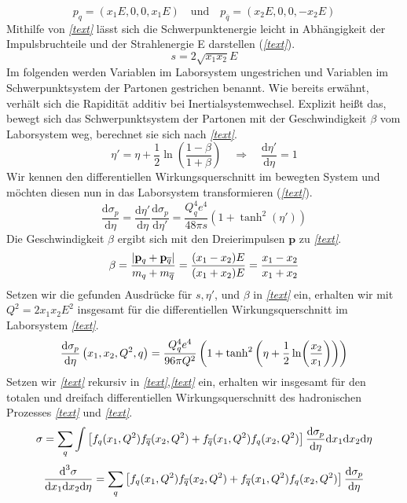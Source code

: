 \begin{equation}
	p_q = \left(x_1E, 0, 0, x_1E\right) \quad \text{und} \quad p_{\overline{q}} = \left(x_2E, 0, 0, -x_2E\right)
\end{equation}
Mithilfe von \textit{\autoref{text}} lässt sich die Schwerpunktenergie leicht in Abhängigkeit der Impulsbruchteile und der Strahlenergie E darstellen (\textit{\autoref{text}}).
\begin{equation}
	s = 2\sqrt{x_1x_2}E
\end{equation}
Im folgenden werden Variablen im Laborsystem ungestrichen und Variablen im Schwerpunktsystem der Partonen gestrichen benannt. Wie bereits erwähnt, verhält sich die Rapidität additiv bei Inertialsystemwechsel. Explizit heißt das, bewegt sich das Schwerpunktsystem der Partonen mit der Geschwindigkeit $\beta$ vom Laborsystem weg, berechnet sie sich nach \textit{\autoref{text}}.
\begin{equation}
	\eta' = \eta + \frac{1}{2}\ln(\frac{1-\beta}{1+\beta}) \quad \Rightarrow \quad \frac{\text{d}\eta'}{\text{d}\eta} = 1 
\end{equation}
Wir kennen den differentiellen Wirkungsquerschnitt im bewegten System und möchten diesen nun in das Laborsystem transformieren (\textit{\autoref{text}}). 
\begin{equation}
	\frac{\text{d}\sigma_p}{\text{d}\eta} = \frac{\text{d}\eta'}{\text{d}\eta} \frac{\text{d}\sigma_p}{\text{d}\eta'} = \frac{Q_q^4e^4}{48\pi s}(1+\tanh^2(\eta'))
\end{equation}
Die Geschwindigkeit $\beta$ ergibt sich mit den Dreierimpulsen $\mathbf{p}$ zu \textit{\autoref{text}}.
\begin{equation}
	\beta = \frac{\abs{\mathbf{p}_q + \mathbf{p}_{\overline{q}}}}{m_q + m_{\overline{q}}} = \frac{(x_1 - x_2)E}{(x_1 + x_2)E} = \frac{x_1 - x_2}{x_1 + x_2}
\end{equation}
Setzen wir die gefunden Ausdrücke für $s, \eta'$, und $\beta$ in \textit{\autoref{text}} ein, erhalten wir mit $Q^2 = 2 x_1 x_2 E^2$ insgesamt für die differentiellen Wirkungsquerschnitt im Laborsystem \textit{\autoref{text}}.
\begin{equation}
	\derivative{\sigma_p}{\eta}\left(x_1, x_2, Q^2, q\right) = \frac{Q_q^4e^4}{96\pi Q^2} \left(1+\tanh^2\left(\eta + \frac{1}{2}\ln(\frac{x_2}{x_1})\right)\right)
\end{equation}
Setzen wir \textit{\autoref{text}} rekursiv in \textit{\autoref{text}},\textit{\autoref{text}} ein, erhalten wir insgesamt für den totalen und dreifach differentiellen Wirkungsquerschnitt des hadronischen Prozesses \textit{\autoref{text}} und \textit{\autoref{text}}.
\begin{equation}
	\sigma = \sum_{q} \int \left[f_q(x_1, Q^2)f_{\overline{q}}(x_2, Q^2) +f_{\overline{q}}(x_1, Q^2)f_{q}(x_2, Q^2) \right] \derivative{\sigma_p}{\eta} \text{d}x_1\text{d}x_2\text{d}\eta
\end{equation}
\begin{equation}
	\frac{\text{d}^3\sigma}{\text{d}x_1\text{d}x_2\text{d}\eta} = \sum_{q} \left[f_q(x_1, Q^2)f_{\overline{q}}(x_2, Q^2) +f_{\overline{q}}(x_1, Q^2)f_{q}(x_2, Q^2) \right] \derivative{\sigma_p}{\eta} 
\end{equation}


